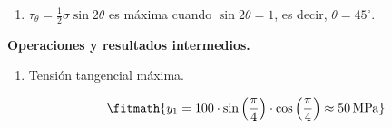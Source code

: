 \begin{enumerate}

\item $\tau_\theta = \tfrac12\sigma\sin 2\theta$ es máxima cuando $\sin 2\theta = 1$, es decir, $\theta = 45^{\circ}$.

\end{enumerate}

\noindent\textbf{Operaciones y resultados intermedios.}

\begin{enumerate}

\item Tensión tangencial máxima.

\[\fitmath{y_{1}=100\cdot \sin\left(\frac{\pi}{4}\right)\cdot \cos\left(\frac{\pi}{4}\right)\approx 50\,\mathrm{MPa}}\]

\end{enumerate}
